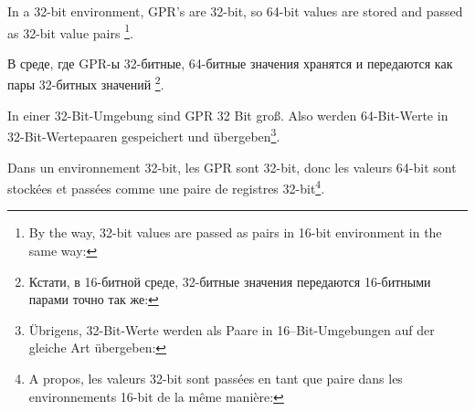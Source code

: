 \ifdefined\ENGLISH
{}
\label{sec:64bit_in_32_env}

In a 32-bit environment, \ac{GPR}'s are 32-bit, so 64-bit values are stored and passed as 32-bit value pairs
\footnote{By the way, 32-bit values are passed as pairs in 16-bit environment in the same way: }.
\fi

\ifdefined\RUSSIAN
{}
\label{sec:64bit_in_32_env}

В среде, где \ac{GPR}-ы 32-битные, 64-битные значения хранятся и передаются как пары 32-битных значений
\footnote{Кстати, в 16-битной среде, 32-битные значения передаются 16-битными парами точно так же: }.
\fi

\ifdefined\GERMAN
{}
\label{sec:64bit_in_32_env}

In einer 32-Bit-Umgebung sind \ac{GPR} 32 Bit groß. Also werden 64-Bit-Werte in
32-Bit-Wertepaaren gespeichert und übergeben\footnote{Übrigens, 32-Bit-Werte werden
als Paare in 16--Bit-Umgebungen auf der gleiche Art übergeben: }.
\fi

\ifdefined\FRENCH
{}
\label{sec:64bit_in_32_env}

Dans un environnement 32-bit, les \ac{GPR} sont 32-bit, donc les valeurs 64-bit sont
stockées et passées comme une paire de registres 32-bit\footnote{A propos, les valeurs
32-bit sont passées en tant que paire dans les environnements 16-bit de la même manière:
}.
\fi








